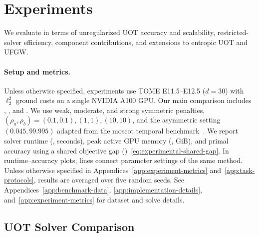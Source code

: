 \section{Experiments}
\label{sec:experiments}

We evaluate \ours in terms of unregularized UOT accuracy and scalability, restricted-solver efficiency, component contributions, and extensions to entropic UOT and UFGW.

\paragraph{Setup and metrics.}
Unless otherwise specified, experiments use TOME E11.5--E12.5 ($d=30$) with $\ell_2^2$ ground costs on a single NVIDIA A100 GPU.
Our main comparison includes \mm, \sinkhorn, and \hellouot.
We use weak, moderate, and strong symmetric penalties, $(\rho_a,\rho_b)=(0.1,0.1),(1,1),(10,10)$, and the asymmetric setting $(0.045,99.995)$ adapted from the moscot temporal benchmark~\citep{klein2025mapping}.
We report solver runtime (\runtime, seconds), peak active GPU memory (\gpumemshort, GiB), and primal accuracy using a shared objective gap (\sharedgap)~\eqref{eq:experimental-shared-gap}.
In runtime--accuracy plots, lines connect parameter settings of the same method.
Unless otherwise specified in Appendices~\ref{app:experiment-metrics} and~\ref{app:task-protocols}, results are averaged over five random seeds.
See Appendices~\ref{app:benchmark-data}, \ref{app:implementation-details}, and~\ref{app:experiment-metrics} for dataset and solve details.

\subsection{UOT Solver Comparison}
\label{sec:uot-comparison}

